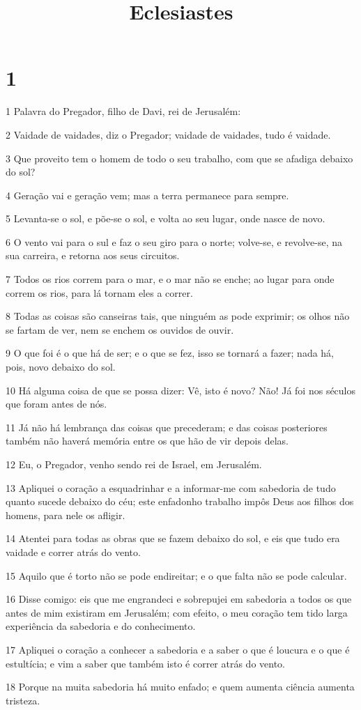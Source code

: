 

\title{Eclesiastes}


\chapter{1}

\par 1 Palavra do Pregador, filho de Davi, rei de Jerusalém:
\par 2 Vaidade de vaidades, diz o Pregador; vaidade de vaidades, tudo é vaidade.
\par 3 Que proveito tem o homem de todo o seu trabalho, com que se afadiga debaixo do sol?
\par 4 Geração vai e geração vem; mas a terra permanece para sempre.
\par 5 Levanta-se o sol, e põe-se o sol, e volta ao seu lugar, onde nasce de novo.
\par 6 O vento vai para o sul e faz o seu giro para o norte; volve-se, e revolve-se, na sua carreira, e retorna aos seus circuitos.
\par 7 Todos os rios correm para o mar, e o mar não se enche; ao lugar para onde correm os rios, para lá tornam eles a correr.
\par 8 Todas as coisas são canseiras tais, que ninguém as pode exprimir; os olhos não se fartam de ver, nem se enchem os ouvidos de ouvir.
\par 9 O que foi é o que há de ser; e o que se fez, isso se tornará a fazer; nada há, pois, novo debaixo do sol.
\par 10 Há alguma coisa de que se possa dizer: Vê, isto é novo? Não! Já foi nos séculos que foram antes de nós.
\par 11 Já não há lembrança das coisas que precederam; e das coisas posteriores também não haverá memória entre os que hão de vir depois delas.
\par 12 Eu, o Pregador, venho sendo rei de Israel, em Jerusalém.
\par 13 Apliquei o coração a esquadrinhar e a informar-me com sabedoria de tudo quanto sucede debaixo do céu; este enfadonho trabalho impôs Deus aos filhos dos homens, para nele os afligir.
\par 14 Atentei para todas as obras que se fazem debaixo do sol, e eis que tudo era vaidade e correr atrás do vento.
\par 15 Aquilo que é torto não se pode endireitar; e o que falta não se pode calcular.
\par 16 Disse comigo: eis que me engrandeci e sobrepujei em sabedoria a todos os que antes de mim existiram em Jerusalém; com efeito, o meu coração tem tido larga experiência da sabedoria e do conhecimento.
\par 17 Apliquei o coração a conhecer a sabedoria e a saber o que é loucura e o que é estultícia; e vim a saber que também isto é correr atrás do vento.
\par 18 Porque na muita sabedoria há muito enfado; e quem aumenta ciência aumenta tristeza.

